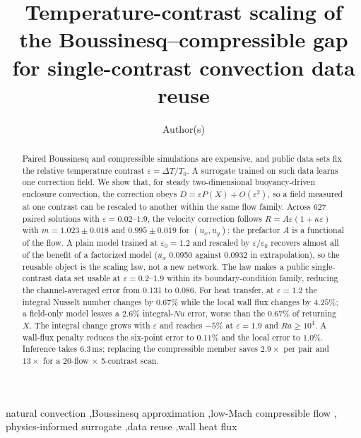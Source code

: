 \documentclass[preprint,11pt,a4paper,times,doubleblind]{elsarticle}
\begin{document}
\begin{frontmatter}

\title{Temperature-contrast scaling of the Boussinesq--compressible gap
for single-contrast convection data reuse}

\author[a]{Author(s)}
\address[a]{Affiliation(s)}

\begin{abstract}
Paired Boussinesq and compressible simulations are expensive, and public data sets fix the
relative temperature contrast $\varepsilon=\Delta T/T_0$. A surrogate trained on such data
learns one correction field. We show that, for steady two-dimensional buoyancy-driven
enclosure convection, the correction obeys $D=\varepsilon P(X)+O(\varepsilon^2)$, so a field
measured at one contrast can be rescaled to another within the same flow family. Across 627
paired solutions with $\varepsilon=0.02$--$1.9$, the velocity correction follows
$R=A\varepsilon(1+\kappa\varepsilon)$ with $m=1.023\pm0.018$ and $0.995\pm0.019$ for
$(u_x,u_y)$; the prefactor $A$ is a functional of the flow. A plain model trained at
$\varepsilon_0=1.2$ and rescaled by $\varepsilon/\varepsilon_0$ recovers almost all of the
benefit of a factorized model ($u_x$ 0.0950 against 0.0932 in extrapolation), so the reusable
object is the scaling law, not a new network. The law makes a public single-contrast data set
usable at $\varepsilon=0.2$--$1.9$ within its boundary-condition family, reducing the
channel-averaged error from 0.131 to 0.086. For heat transfer, at $\varepsilon=1.2$ the
integral Nusselt number changes by $0.67\%$ while the local wall flux changes by $4.25\%$; a
field-only model leaves a $2.6\%$ integral-$Nu$ error, worse than the $0.67\%$ of returning
$X$. The integral change grows with $\varepsilon$ and reaches $-5\%$ at $\varepsilon=1.9$ and
$Ra\ge10^4$. A wall-flux penalty reduces the six-point error to $0.11\%$ and the local error
to $1.0\%$. Inference takes 6.3\,ms; replacing the compressible member saves $2.9\times$ per
pair and $13\times$ for a 20-flow $\times$ 5-contrast scan.
\end{abstract}

\begin{keyword}
natural convection \sep Boussinesq approximation \sep low-Mach compressible flow \sep
physics-informed surrogate \sep data reuse \sep wall heat flux
\end{keyword}

\end{frontmatter}
\end{document}
